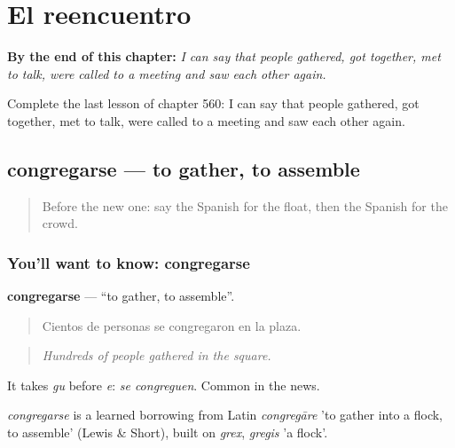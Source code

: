 
\chapter{El reencuentro}
\label{ch:es-el-reencuentro}

\begin{chapteropening}
\textbf{By the end of this chapter:} \emph{I can say that people gathered, got together, met to talk, were called to a meeting and saw each other again.}

Complete the last lesson of chapter 560: I can say that people gathered, got together, met to talk, were called to a meeting and saw each other again.
\end{chapteropening}

\section[congregarse]{congregarse — to gather, to assemble}

\label{lesson:ES-C560-congregarse}



\begin{quote}
Before the new one: say the Spanish for the float, then the Spanish for the crowd.
\end{quote}

\subsection*{You'll want to know: congregarse}
\textbf{congregarse} — \textquotedblleft{}to gather, to assemble\textquotedblright{}.

\begin{quote}
Cientos de personas se congregaron en la plaza.
\end{quote}

\begin{quote}
\emph{Hundreds of people gathered in the square.}
\end{quote}

It takes \emph{gu} before \emph{e}: \emph{se congreguen}. Common in the news.

\begin{cousinweb}
\emph{congregarse} is a learned borrowing from Latin \emph{congregāre} 'to gather into a flock, to assemble' (Lewis \& Short), built on \emph{grex}, \emph{gregis} 'a flock'.
\end{cousinweb}

